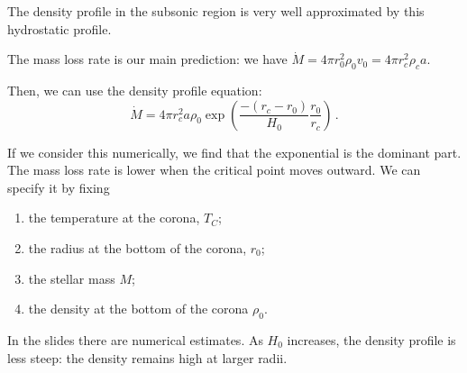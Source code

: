 \documentclass[main.tex]{subfiles}
\begin{document}
The density profile in the subsonic region is very well approximated by this hydrostatic profile.

The mass loss rate is our main prediction: we have \(\dot{M } = 4 \pi r^2_0 \rho_0 v_0 = 4 \pi r_c^2\rho_c a\).

Then, we can use the density profile equation: 
%
\begin{equation}
  \dot{M} = 4 \pi r_c^2 a \rho_0 \exp(\frac{-(r_c - r_0 )}{H_0 } \frac{r_0 }{r_c}) 
\,.
\end{equation}
%

If we consider this numerically, we find that the exponential is the dominant part.
The mass loss rate is lower when the critical point moves outward.
We can specify it by fixing 
%
\begin{enumerate}
    \item the temperature at the corona, \(T_C\);
    \item the radius at the bottom of the corona, \(r_0 \);
    \item the stellar mass \(M\);
    \item the density at the bottom of the corona \(\rho_0 \).
\end{enumerate}

In the slides there are numerical estimates. 
As \(H_0 \) increases, the density profile is less steep: the density remains high at larger radii.
\end{document}
